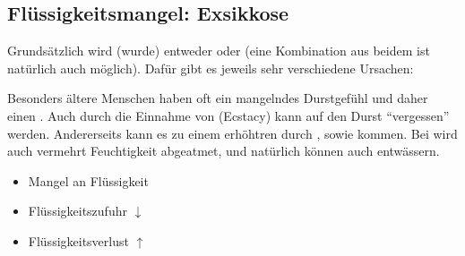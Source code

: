 






\subsection{Flüssigkeitsmangel: Exsikkose}
\label{topic:exsikkose}%


{%
Grundsätzlich wird (wurde) entweder  oder  (eine Kombination aus beidem ist natürlich auch
möglich). Dafür gibt es jeweils sehr verschiedene Ursachen:

Besonders ältere Menschen haben oft ein mangelndes
Durstgefühl und daher einen . Auch durch die
Einnahme von  (Ecstacy) kann auf den Durst
\enquote{vergessen} werden.
Andererseits kann es zu einem erhöhtren
 durch , 
sowie  kommen. Bei  wird
auch vermehrt Feuchtigkeit abgeatmet, und natürlich können
auch  entwässern.
}{
\begin{itemize} %
  \item Mangel an Flüssigkeit
  \item Flüssigkeitszufuhr ${\downarrow}$
  \item Flüssigkeitsverlust ${\uparrow}$
\end{itemize}
}{}{}{}

